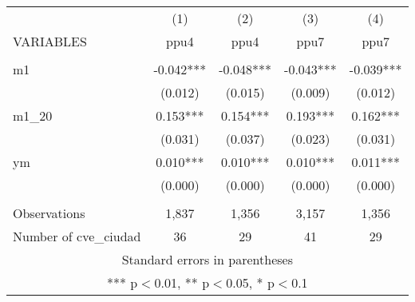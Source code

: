 \begin{tabular}{lcccc} \hline
 & (1) & (2) & (3) & (4) \\
VARIABLES & ppu4 & ppu4 & ppu7 & ppu7 \\ \hline
 &  &  &  &  \\
m1 & -0.042*** & -0.048*** & -0.043*** & -0.039*** \\
 & (0.012) & (0.015) & (0.009) & (0.012) \\
m1\_20 & 0.153*** & 0.154*** & 0.193*** & 0.162*** \\
 & (0.031) & (0.037) & (0.023) & (0.031) \\
ym & 0.010*** & 0.010*** & 0.010*** & 0.011*** \\
 & (0.000) & (0.000) & (0.000) & (0.000) \\
 &  &  &  &  \\
Observations & 1,837 & 1,356 & 3,157 & 1,356 \\
 Number of cve\_ciudad & 36 & 29 & 41 & 29 \\ \hline
\multicolumn{5}{c}{ Standard errors in parentheses} \\
\multicolumn{5}{c}{ *** p$<$0.01, ** p$<$0.05, * p$<$0.1} \\
\end{tabular}
